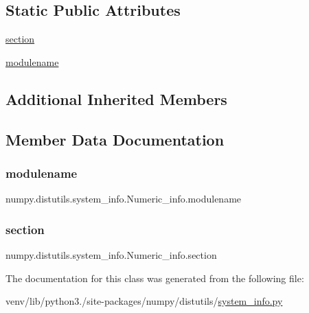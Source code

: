 \subsection*{Static Public Attributes}
\begin{DoxyCompactItemize}
\item 
\hyperlink{classnumpy_1_1distutils_1_1system__info_1_1Numeric__info_a82a319ac2cc48b52fa6eb3f80875232e}{section}
\item 
\hyperlink{classnumpy_1_1distutils_1_1system__info_1_1Numeric__info_a20591709e8515616aa4f4de51c807ced}{modulename}
\end{DoxyCompactItemize}
\subsection*{Additional Inherited Members}


\subsection{Member Data Documentation}
\mbox{\label{classnumpy_1_1distutils_1_1system__info_1_1Numeric__info_a20591709e8515616aa4f4de51c807ced}} 
\subsubsection{\texorpdfstring{modulename}{modulename}}
{\footnotesize\ttfamily numpy.\+distutils.\+system\+\_\+info.\+Numeric\+\_\+info.\+modulename\hspace{0.3cm}{\ttfamily [static]}}

\mbox{\label{classnumpy_1_1distutils_1_1system__info_1_1Numeric__info_a82a319ac2cc48b52fa6eb3f80875232e}} 
\subsubsection{\texorpdfstring{section}{section}}
{\footnotesize\ttfamily numpy.\+distutils.\+system\+\_\+info.\+Numeric\+\_\+info.\+section\hspace{0.3cm}{\ttfamily [static]}}



The documentation for this class was generated from the following file\+:\begin{DoxyCompactItemize}
\item 
venv/lib/python3./site-\/packages/numpy/distutils/\hyperlink{system__info_8py}{system\+\_\+info.\+py}\end{DoxyCompactItemize}
